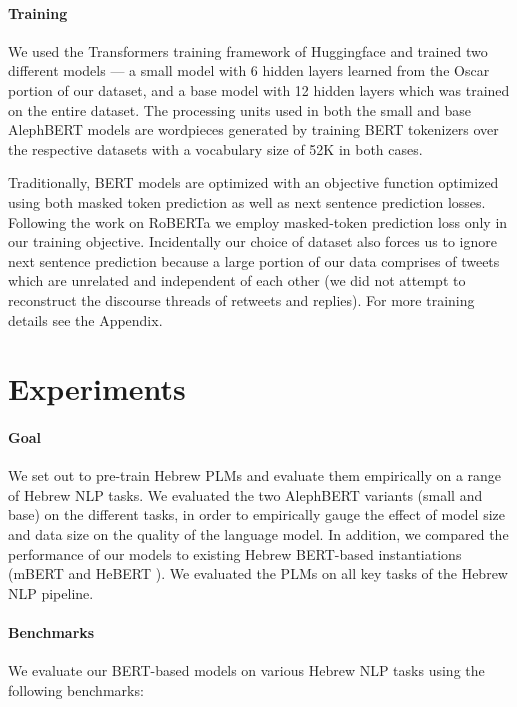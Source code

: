\documentclass[11pt,a4paper]{article}
\begin{document}
\paragraph{Training}
We used the Transformers training framework of Huggingface \cite{wolf-etal-2020-transformers} and trained two different models --- a small model with 6 hidden layers learned from the Oscar portion of our dataset, and a base model with 12 hidden layers which was trained on the entire dataset.
The processing units used in both the small and base AlephBERT models are wordpieces generated by training BERT tokenizers over the respective datasets with a vocabulary size of 52K in both cases.

Traditionally, BERT models are optimized with an objective function optimized using both masked token prediction as well as next sentence prediction losses.
Following the work on RoBERTa \cite{roberta} we employ masked-token prediction loss only in our training objective. 
Incidentally our choice of dataset also forces us to ignore next sentence prediction because a large portion of our data comprises of tweets  which are unrelated and independent of each other (we did not attempt to reconstruct the discourse threads  of retweets and replies).
For more training details see the Appendix.

\section{Experiments}
\paragraph{Goal}
We set out to pre-train Hebrew PLMs and evaluate them empirically on a range of Hebrew NLP tasks. 
We evaluated the two {AlephBERT} variants (small and base)   on the different  tasks, in order to empirically gauge the effect of model size and data size on the quality of the language model.
In addition, we compared the performance of our models to existing Hebrew BERT-based instantiations (mBERT \cite{bert} and HeBERT \cite{hebert}). 
We evaluated the PLMs  on all key tasks of the Hebrew NLP pipeline.


\paragraph{Benchmarks} 
We evaluate our BERT-based models on various Hebrew NLP tasks   using the following   benchmarks:
\end{document}
